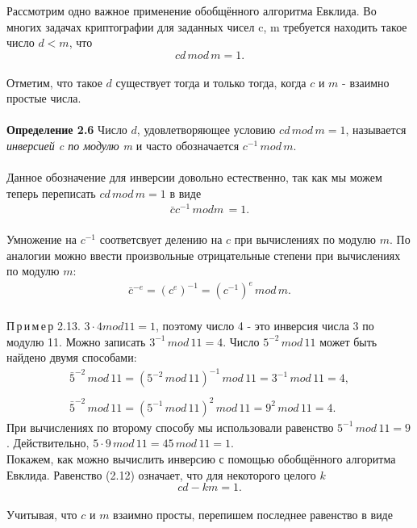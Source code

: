\documentclass{article}
\begin{document}
\\\\
Рассмотрим одно важное применение обобщённого алгоритма Евклида. Во многих задачах криптографии для заданных чисел c, m требуется находить такое число  $d < m$, что
\begin{equation}
cd\, mod\, m = 1. 
 \end{equation}
\\
Отметим, что такое $d$ существует тогда и только тогда, когда $c$ и $m$ - взаимно простые числа.
\\\\
\textbf{Определение  2.6}  Число $d$, удовлетворяющее условию $cd\, mod\, m = 1$, называется  \emph{инверсией c по модулю m} и часто обозначается  $c^{-1}\,mod\,m$.
\\\\
Данное обозначение для инверсии довольно естественно, так как мы можем теперь переписать $cd\, mod\, m = 1$ в виде
\begin{gather*} 
\bar cc^{-1}\,mod m\, = 1.
\end{gather*}
\\
Умножение на $c^{-1}$ соответсвует делению на $c$ при вычислениях по модулю $m$. По аналогии можно ввести произвольные отрицательные степени при вычислениях по модулю $m$:
\begin{gather*} 
\bar c^{-e}  = {(c^{e})}^{-1}  = {(c^{-1})}^e  \,mod\, m.
\end{gather*}
\\
П\,р\,и\,м\,е\,р 2.13. \;\;  $3\cdot4 mod 11 = 1$, поэтому число 4 - это инверсия числа 3 по модулю 11. Можно записать $3^{-1}\,mod\,11 = 4 $. Число $5^{-2}\,mod\,11$ может быть найдено двумя способами:
\begin{gather*} 
\bar  5^{-2}\,mod\,11  = (5^{-2}\,mod\,11)^{-1}\,mod\,11 = 3^{-1}\,mod\,11 = 4,
\\\\
\bar   5^{-2}\,mod\,11  = (5^{-1}\,mod\,11)^{2}\,mod\,11 = 9^{2}\,mod\,11 = 4. 
\end{gather*}
При вычислениях по второму способу мы использовали равенство  $5^{-1}\,mod\,11 = 9$. Действительно, $5\cdot9\,mod\,11 = 45\,mod\,11 = 1$.
\\
Покажем, как можно вычислить инверсию с помощью обобщённого алгоритма Евклида. Равенство (2.12) означает, что для некоторого целого $k$
\begin{equation}
cd - km = 1. 
 \end{equation}
\\
Учитывая, что $c$ и $m$ взаимно просты, перепишем последнее равенство в виде
\end{document}
